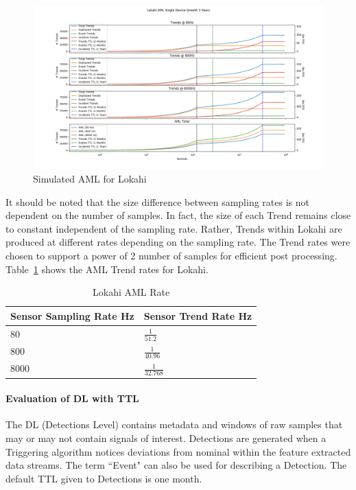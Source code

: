 \begin{figure}[H]
	\centering
	\includegraphics[width=\linewidth]{figures/sim_aml_lokahi.png}
	\caption{Simulated AML for Lokahi}
	\label{fig:sim_aml_lokahi}
\end{figure}

It should be noted that the size difference between sampling rates is not dependent on the number of samples. In fact, the size of each Trend remains close to constant independent of the sampling rate. Rather, Trends within Lokahi are produced at different rates depending on the sampling rate. The Trend rates were chosen to support a power of 2 number of samples for efficient post processing. Table~\ref{table:lokahi_aml_rate} shows the AML Trend rates for Lokahi.

\begin{table}[H]
	\centering
	\caption{Lokahi AML Rate}
	\begin{tabularx}{\textwidth}{Xl}
		\toprule
		\textbf{Sensor Sampling Rate Hz} & \textbf{Sensor Trend Rate Hz} \\
		\midrule
		80 & $\frac{1}{51.2}$ \\
		800 & $\frac{1}{40.96}$ \\
		8000 & $\frac{1}{32.768}$ \\
		\bottomrule
	\end{tabularx}
	\label{table:lokahi_aml_rate}
\end{table}

\paragraph{Evaluation of DL with TTL}

The DL (Detections Level) contains metadata and windows of raw samples that may or may not contain signals of interest. Detections are generated when a Triggering algorithm notices deviations from nominal within the feature extracted data streams. The term ``Event" can also be used for describing a Detection. The default TTL given to Detections is one month.

